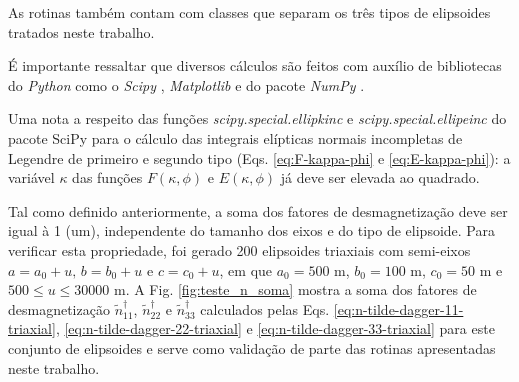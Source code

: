 As rotinas também contam com classes que separam os três tipos de elipsoides tratados neste trabalho.

É importante ressaltar que diversos cálculos são feitos com auxílio de bibliotecas do \textit{Python} como o \textit{Scipy} \citet{scipy}, \textit{Matplotlib} \citet{matplotlib} e do pacote \textit{NumPy} \citet{numpy}.

Uma nota a respeito das funções \textit{scipy.special.ellipkinc} e \textit{scipy.special.ellipeinc} do pacote SciPy para o cálculo das integrais elípticas normais incompletas de Legendre de primeiro e segundo tipo (Eqs. \ref{eq:F-kappa-phi} e \ref{eq:E-kappa-phi}): a variável $\kappa$ das funções $F(\kappa, \phi)$ e $E(\kappa, \phi)$ já deve ser elevada ao quadrado.

Tal como definido anteriormente, a soma dos fatores de desmagnetização deve ser igual à 1 (um), independente do tamanho dos eixos e do tipo de elipsoide. Para verificar esta propriedade, foi gerado 200 elipsoides triaxiais com semi-eixos $a = a_0 +u, \, b = b_0+u$ e $c = c_0+u$, em que $a_0=500$ m, $b_0=100$ m, $c_0=50$ m e $500  \le u \le 30000$ m. A Fig. \ref{fig:teste_n_soma} mostra a soma dos fatores de desmagnetização $\tilde{n}^{\dagger}_{11}$, $\tilde{n}^{\dagger}_{22}$ e $\tilde{n}^{\dagger}_{33}$ calculados pelas Eqs. \ref{eq:n-tilde-dagger-11-triaxial}, \ref{eq:n-tilde-dagger-22-triaxial} e \ref{eq:n-tilde-dagger-33-triaxial} para este conjunto de elipsoides e serve como validação de parte das rotinas apresentadas neste trabalho.

